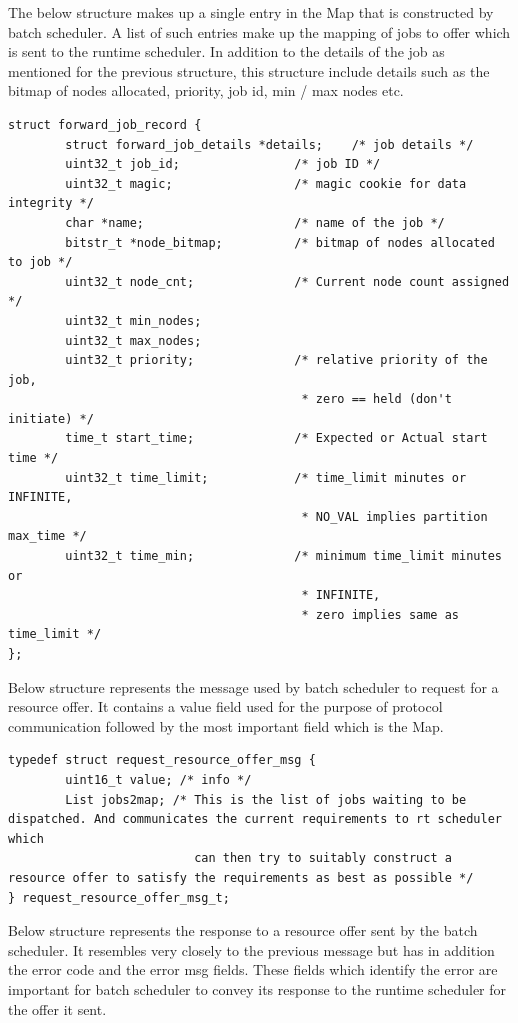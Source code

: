 The below structure makes up a single entry in the Map that is constructed by batch scheduler. A list of such entries make up the mapping of jobs to offer which is sent to the runtime scheduler. In addition to the details of the job as mentioned for the previous structure, this structure include details such as the bitmap of nodes allocated, priority, job id, min / max nodes etc.
\begin{lstlisting}[mathescape]
struct forward_job_record {
        struct forward_job_details *details;    /* job details */
        uint32_t job_id;                /* job ID */
        uint32_t magic;                 /* magic cookie for data integrity */
        char *name;                     /* name of the job */
        bitstr_t *node_bitmap;          /* bitmap of nodes allocated to job */
        uint32_t node_cnt;              /* Current node count assigned */
        uint32_t min_nodes;
        uint32_t max_nodes;
        uint32_t priority;              /* relative priority of the job,
                                         * zero == held (don't initiate) */
        time_t start_time;              /* Expected or Actual start time */
        uint32_t time_limit;            /* time_limit minutes or INFINITE,
                                         * NO_VAL implies partition max_time */
        uint32_t time_min;              /* minimum time_limit minutes or
                                         * INFINITE,
                                         * zero implies same as time_limit */
};
\end{lstlisting}
Below structure represents the message used by batch scheduler to request for a resource offer. It contains a value field used for the purpose of protocol communication followed by the most important field which is the Map.
\begin{lstlisting}[mathescape]
typedef struct request_resource_offer_msg {
        uint16_t value; /* info */
        List jobs2map; /* This is the list of jobs waiting to be dispatched. And communicates the current requirements to rt scheduler which 
                          can then try to suitably construct a resource offer to satisfy the requirements as best as possible */
} request_resource_offer_msg_t;
\end{lstlisting}
Below structure represents the response to a resource offer sent by the batch scheduler. It resembles very closely to the previous message but has in addition the error code and the error msg fields. These fields which identify the error are important for batch scheduler to convey its response to the runtime scheduler for the offer it sent.
